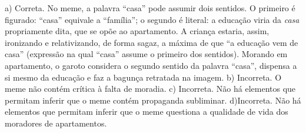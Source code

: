 \begin{enumerate}
a) Correta. No meme, a palavra ``casa'' pode assumir dois sentidos. O primeiro
é figurado: ``casa'' equivale a ``família''; o segundo é literal: a educação
viria da \textit{casa} propriamente dita, que se opõe ao apartamento. A criança 
estaria, assim, ironizando e relativizando, de forma sagaz, a máxima de que 
``a educação vem de casa'' (expressão na qual ``casa'' assume o primeiro dos 
sentidos). Morando em apartamento, o garoto considera o segundo sentido da palavra
``casa'', dispensa a si mesmo da educação e faz a bagunça retratada na imagem.    
b) Incorreta. O meme não contém crítica à falta de moradia.
c) Incorreta. Não há elementos que permitam inferir que o meme contém propaganda 
subliminar. 
d)Incorreta. Não há elementos que permitam inferir que o meme questiona a qualidade 
de vida dos moradores de apartamentos.
\end{enumerate}


